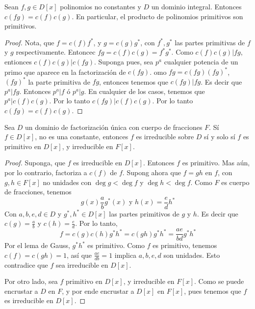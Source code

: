 \begin{lemma}\label{18.75}
    Sean $f,g \in D[x]$ polinomios no constantes y $D$ un dominio integral.
    Entonces $c(fg)=c(f)c(g)$. En particular, el producto de polinomios
    primitivos son primitivos.
\end{lemma}
\begin{proof}
    Nota, que $f=c(f)f^*$, y $g=c(g)g^*$, con $f^*,g^*$ las partes primitivas de
     $f$ y  $g$ respectivamente. Entoncec $fg=c(f)c(g)=f^*g^*$. Como
     $c(f)c(g)|fg$, entionces $c(f)c(g)|c(fg)$. Suponga pues, sea $p^a$
     cualquier potencia de un primo que aparece en la factorizaci\'on de
     $c(fg)$. omo $fg=c(fg)(fg)^*$, $(fg)^*$ la parte primitiva de $fg$,
     entonces tenemos que  $c(fg)|fg$. Es decir que $p^a|fg$. Entonces $p^a|f$
     \'o $p^a|g$. En cualquier de los casos, tenemos que $p^a|c(f)c(g)$. Por lo
     tanto $c(fg)|c(f)c(g)$. Por lo tanto $c(fg)=c(f)c(g)$.
\end{proof}

\begin{theorem}\label{18.76}
    Sea $D$ un dominio de factorizaci\'on \'unica con cuerpo de fracciones $F$.
    S\'i $f \in D[x]$, no es una constante, entonces $f$ es irreducible sobre
    $D$ s\'i y solo s\'i $f$ es primitivo en $D[x]$, y irreducible en $F[x]$.
\end{theorem}
\begin{proof}
    Suponga, que $f$ es irreducible en $D[x]$.  Entonces $f$ es primitivo. Mas
    a\'un, por lo contrario, factoriza a  $c(f)$ de $f$. Supong ahora que
    $f=gh$ en  $f$, con $g,h \in F[x]$ no unidades con $\deg{g}<\deg{f}$ y
    $\deg{h}<\deg{f}$. Como $F$ es cuerpo de fracciones, tenemos
    \begin{equation*}
        g(x)\frac{a}{b}g^*(x) \text{ y } h(x)=\frac{e}{d}h^*
    \end{equation*}
    Con $a,b,e,d \in D$ y  $g^*,h^* \in D[x]$ las partes primitivos de $g$ y
    $h$. Es decir que  $c(g)=\frac{a}{b}$ y $c(h)=\frac{e}{d}$. Por lo tanto,
    \begin{equation*}
        f=c(g)c(h)g^*h^*=c(gh)g^*h^*=\frac{ae}{bd}g^*h^*
    \end{equation*}
    Por el lema de Gauss,  $g^*h^*$ es primitivo. Como $f$ es primitivo, tenemos
    $c(f)=c(gh)=1$, as\'i que $\frac{ae}{db}=1$ implica $a,b,e,d$ son unidades.
    Esto contradice que  $f$ sea irreducible en $D[x]$.

    Por otro lado, sea $f$ primitivo en $D[x]$, y irreducible en  $F[x]$. Como
    se puede encrustar a $D$ en  $F$, y por ende encrustar a  $D[x]$ en $F[x]$,
    pues tenemos que $f$ es irreducible en  $D[x]$.
\end{proof}
